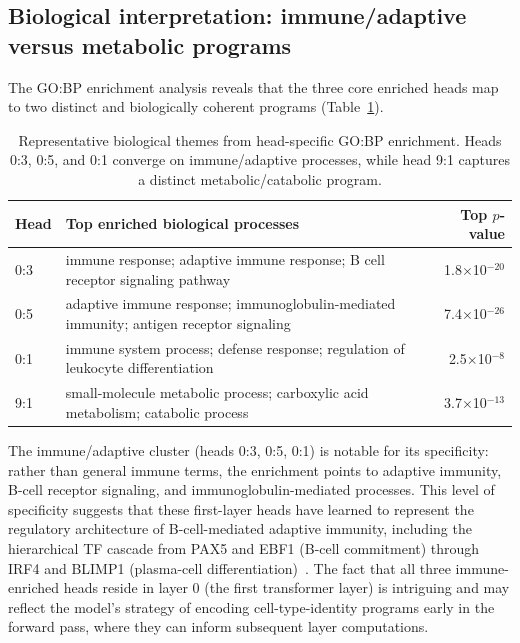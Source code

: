\documentclass[11pt]{article}
\begin{document}
\subsection{Biological interpretation: immune/adaptive versus metabolic programs}

The GO:BP enrichment analysis reveals that the three core enriched heads map to two distinct and biologically coherent programs (Table~\ref{tab:themes}).

\begin{table}[htbp]
\centering
\small
\caption{Representative biological themes from head-specific GO:BP enrichment. Heads 0:3, 0:5, and 0:1 converge on immune/adaptive processes, while head 9:1 captures a distinct metabolic/catabolic program.}
\label{tab:themes}
\begin{tabular}{l>{\raggedright\arraybackslash}p{8.3cm}r}
\toprule
Head & Top enriched biological processes & Top $p$-value \\
\midrule
0:3 & immune response; adaptive immune response; B cell receptor signaling pathway & 1.8$\times$10$^{-20}$ \\
0:5 & adaptive immune response; immunoglobulin-mediated immunity; antigen receptor signaling & 7.4$\times$10$^{-26}$ \\
0:1 & immune system process; defense response; regulation of leukocyte differentiation & 2.5$\times$10$^{-8}$ \\
9:1 & small-molecule metabolic process; carboxylic acid metabolism; catabolic process & 3.7$\times$10$^{-13}$ \\
\bottomrule
\end{tabular}
\end{table}

The immune/adaptive cluster (heads 0:3, 0:5, 0:1) is notable for its specificity: rather than general immune terms, the enrichment points to adaptive immunity, B-cell receptor signaling, and immunoglobulin-mediated processes. This level of specificity suggests that these first-layer heads have learned to represent the regulatory architecture of B-cell-mediated adaptive immunity, including the hierarchical TF cascade from PAX5 and EBF1 (B-cell commitment) through IRF4 and BLIMP1 (plasma-cell differentiation)~\cite{han2018trrust}. The fact that all three immune-enriched heads reside in layer 0 (the first transformer layer) is intriguing and may reflect the model's strategy of encoding cell-type-identity programs early in the forward pass, where they can inform subsequent layer computations.
\end{document}
